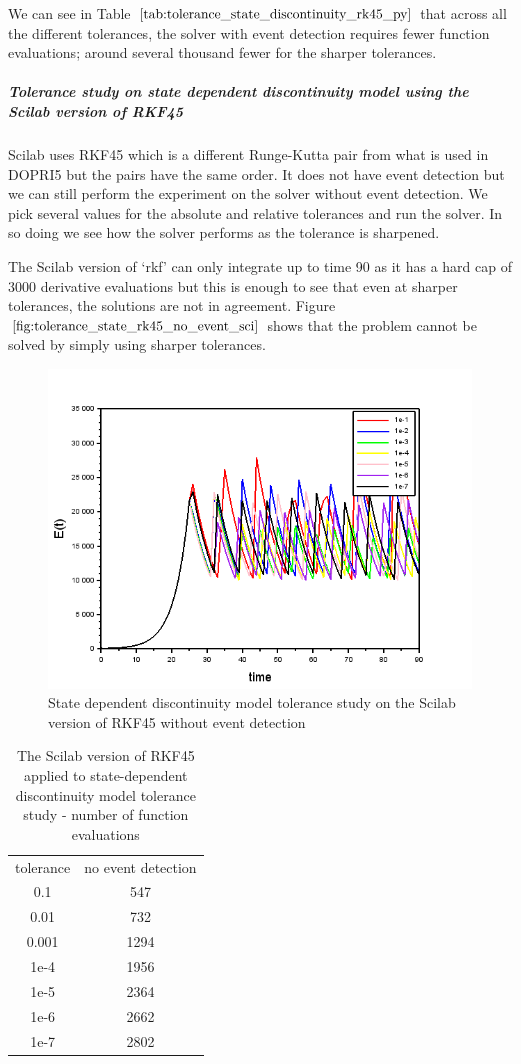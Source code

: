 We can see in Table $\ref{tab:tolerance_state_discontinuity_rk45_py}$ that across all the different tolerances, the solver with event detection requires fewer function evaluations; around several thousand fewer for the sharper tolerances. 

\subparagraph{Tolerance study on state dependent discontinuity model using the Scilab version of RKF45}
Scilab uses RKF45 which is a different Runge-Kutta pair from what is used in DOPRI5 but the pairs have the same order. It does not have event detection but we can still perform the experiment on the solver without event detection. We pick several values for the absolute and relative tolerances and run the solver. In so doing we see how the solver performs as the tolerance is sharpened. 

The Scilab version of `rkf' can only integrate up to time 90 as it has a hard cap of 3000 derivative evaluations but this is enough to see that even at sharper tolerances, the solutions are not in agreement. Figure $\ref{fig:tolerance_state_rk45_no_event_sci}$ shows that the problem cannot be solved by simply using sharper tolerances. 
\begin{figure}[h]
\centering
\includegraphics[width=0.7\linewidth]{./figures/tolerance_state_rk45_no_event_sci}
\caption{State dependent discontinuity model tolerance study on the Scilab version of RKF45 without event detection}
\label{fig:tolerance_state_rk45_no_event_sci}
\end{figure}

\begin{table}[h]
\caption {The Scilab version of RKF45 applied to state-dependent discontinuity model tolerance study - number of function evaluations} \label{tab:tolerance_state_discontinuity_rk45_scilab} 
\begin{center}
\begin{tabular}{ c c }
tolerance & no event detection \\ 
0.1 & 547 \\
0.01 & 732 \\
0.001 & 1294 \\
1e-4 & 1956 \\
1e-5 & 2364 \\
1e-6 & 2662 \\
1e-7 & 2802 \\
\end{tabular}
\end{center}
\end{table}

